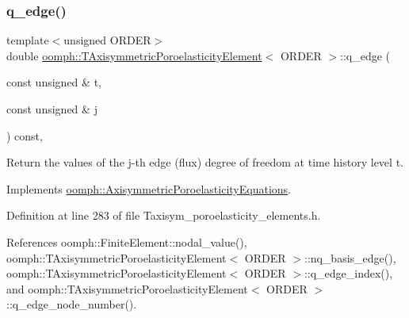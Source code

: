 \mbox{\label{classoomph_1_1TAxisymmetricPoroelasticityElement_aecff7a5e70e3567800d142f0fb24660e}} 
\subsubsection{\texorpdfstring{q\+\_\+edge()}{q\_edge()}\hspace{0.1cm}{\footnotesize\ttfamily [2/2]}}
{\footnotesize\ttfamily template$<$unsigned O\+R\+D\+ER$>$ \\
double \hyperlink{classoomph_1_1TAxisymmetricPoroelasticityElement}{oomph\+::\+T\+Axisymmetric\+Poroelasticity\+Element}$<$ O\+R\+D\+ER $>$\+::q\+\_\+edge (\begin{DoxyParamCaption}\item[{const unsigned \&}]{t,  }\item[{const unsigned \&}]{j }\end{DoxyParamCaption}) const\hspace{0.3cm}{\ttfamily [inline]}, {\ttfamily [virtual]}}



Return the values of the j-\/th edge (flux) degree of freedom at time history level t. 



Implements \hyperlink{classoomph_1_1AxisymmetricPoroelasticityEquations_a8e5f2e3dbc4711493ca9eb80a9ee3911}{oomph\+::\+Axisymmetric\+Poroelasticity\+Equations}.



Definition at line 283 of file Taxisym\+\_\+poroelasticity\+\_\+elements.\+h.



References oomph\+::\+Finite\+Element\+::nodal\+\_\+value(), oomph\+::\+T\+Axisymmetric\+Poroelasticity\+Element$<$ O\+R\+D\+E\+R $>$\+::nq\+\_\+basis\+\_\+edge(), oomph\+::\+T\+Axisymmetric\+Poroelasticity\+Element$<$ O\+R\+D\+E\+R $>$\+::q\+\_\+edge\+\_\+index(), and oomph\+::\+T\+Axisymmetric\+Poroelasticity\+Element$<$ O\+R\+D\+E\+R $>$\+::q\+\_\+edge\+\_\+node\+\_\+number().

\mbox{\label{classoomph_1_1TAxisymmetricPoroelasticityElement_a433c2b7027ae1c718c085cc79c525baa}} 
